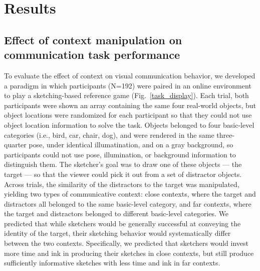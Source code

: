 \documentclass[9pt,twocolumn,twoside]{pnas-new}
\begin{document}
\section*{Results}

\subsection*{Effect of context manipulation on communication task performance}



To evaluate the effect of context on visual communication behavior, we developed a paradigm in which participants (N=192) were paired in an online environment to play a sketching-based reference game (Fig.~\ref{task_display}). 
Each trial, both participants were shown an array containing the same four real-world objects, but object locations were randomized for each participant so that they could not use object location information to solve the task. Objects belonged to four basic-level categories (i.e., bird, car, chair, dog), and were rendered in the same three-quarter pose, under identical illumatination, and on a gray background, so participants could not use pose, illumination, or background information to distinguish them. 
The sketcher's goal was to draw one of these objects --- the target --- so that the viewer could pick it out from a set of distractor objects. 
Across trials, the similarity of the distractors to the target was manipulated, yielding two types of communicative context: close contexts, where the target and distractors all belonged to the same basic-level category, and far contexts, where the target and distractors belonged to different basic-level categories. 
We predicted that while sketchers would be generally successful at conveying the identity of the target, their sketching behavior would systematically differ between the two contexts. 
Specifically, we predicted that sketchers would invest more time and ink in producing their sketches in close contexts, but still produce sufficiently informative sketches with less time and ink in far contexts. 
\end{document}
